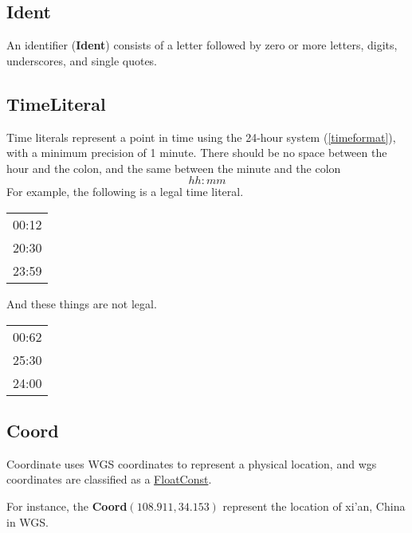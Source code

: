 \subsection{Ident}\label{Ident}
An identifier (\textbf{Ident}) consists of a letter followed by zero or more letters, digits, underscores, and single quotes.
\begin{grammar}
\end{grammar}

\subsection{TimeLiteral}\label{TimeLiteral}
Time literals represent a point in time using the 24-hour system (\ref{timeformat}), with a minimum precision of 1 minute.
There should be no space between the hour and the colon, and the same between the minute and the colon
\begin{equation}\label{timeformat}
    hh:mm
\end{equation}
For example, the following is a legal time literal.

\begin{center}
    \begin{tabular}{c}
        00:12 \\
        20:30 \\
        23:59 \\
    \end{tabular}
\end{center}
And these things are not legal.

\begin{center}
    \begin{tabular}{c}
        00:62 \\
        25:30 \\
        24:00 \\
    \end{tabular}
\end{center}

\subsection{Coord} \label{Coord}
Coordinate uses WGS coordinates to represent a physical location, and wgs coordinates are classified as a \hyperref[FloatConst]{FloatConst}.
\begin{grammar}
\end{grammar}
For instance, the \textbf{Coord}$(108.911, 34.153)$ represent the location of  xi'an, China in WGS.

